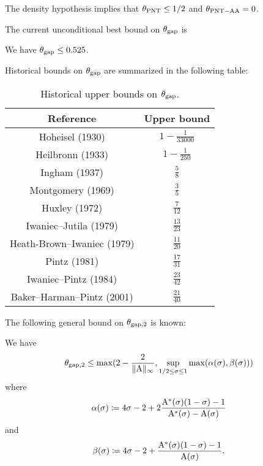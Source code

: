 \begin{corollary}  The density hypothesis implies that $\theta_{\mathrm{PNT}} \leq 1/2$ and $\theta_{\mathrm{PNT-AA}} = 0$.
\end{corollary}

The current unconditional best bound on $\theta_{\mathrm{gap}}$ is

\begin{theorem}\label{bhp-thm}\cite{baker-harman-pintz} We have $\theta_{\mathrm{gap}} \leq 0.525$.
\end{theorem}

Historical bounds on $\theta_{\mathrm{gap}}$ are summarized in the following table:

\begin{table}[ht]
    \caption{Historical upper bounds on $\theta_{\mathrm{gap}}$.}
    \centering
    \renewcommand{\arraystretch}{1.2}
    \begin{tabular}{|c|c|}
    \hline
    Reference & Upper bound \\
    \hline
    Hoheisel (1930) \cite{hoheisel_1930} & $1 - \frac{1}{33000}$ \\
    Heilbronn (1933) \cite{heilbronn_1933} & $1 - \frac{1}{250}$ \\
    Ingham (1937) \cite{ingham_difference_1937} & $\frac{5}{8}$ \\
    Montgomery (1969) \cite{montgomery_1969} & $\frac{3}{5}$ \\
    Huxley (1972) \cite{Huxley} & $\frac{7}{12}$ \\
    Iwaniec--Jutila (1979)\cite{iwaniec-jutila} & $\frac{13}{23}$ \\
    Heath-Brown--Iwaniec (1979) \cite{heathbrown_iwaniec_1979} & $\frac{11}{20}$ \\
    Pintz (1981) \cite{pintz_1981} & $\frac{17}{31}$ \\
    Iwaniec--Pintz (1984) \cite{iwaniec-pintz} & $\frac{23}{42}$\\
    Baker--Harman--Pintz (2001) \cite{baker-harman-pintz} & $\frac{21}{40}$ \\
    \hline
    \end{tabular}
    \end{table}\label{gapmax-table}


The following general bound on $\theta_{\mathrm{gap},2}$ is known:

\begin{proposition}\label{gapsquare-from-a}
    We have
    $$ \theta_{\mathrm{gap},2} \leq \max( 2-\frac{2}{\|\mathrm{A}\|_\infty}, \sup_{1/2 \leq \sigma \leq 1} \max(\alpha(\sigma), \beta(\sigma)))$$
    where
    $$ \alpha(\sigma) \coloneqq 4\sigma-2 + 2 \frac{\mathrm{A}^*(\sigma)(1-\sigma)-1}{\mathrm{A}^*(\sigma)-\mathrm{A}(\sigma)}$$
    and
    $$ \beta(\sigma) \coloneqq 4\sigma-2 + \frac{\mathrm{A}^*(\sigma)(1-\sigma)-1}{\mathrm{A}(\sigma)}.$$
\end{proposition}

